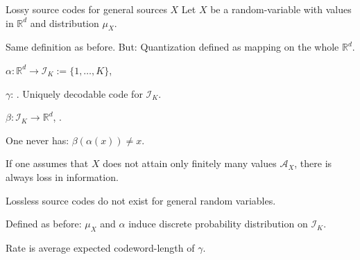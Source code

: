 \begin{frame}{Lossy source codes for general sources $X$} 
Let $X$ be a random-variable with values in $\mathbb{R}^d$ and distribution $\mu_X$. 
\bit
\item Same definition as before. But: Quantization defined as mapping on the whole $\mathbb{R}^d$.
\item $\alpha: \mathbb{R}^d\to \mathcal{I}_K:=\{1,\dots,K\}$, 
\item $\gamma$: . Uniquely decodable code for $\mathcal{I}_K$. 
\item $\beta: \mathcal{I}_K\to\mathbb{R}^d$, . 
\eit

\bit
\item One never has: $\beta(\alpha(x))\neq x$.
\item[\iarrow] If one assumes that $X$ does not attain only finitely many values $\mathcal{A}_X$,  there is always loss in information.
\item Lossless source codes do not exist for general random variables.
\eit
\vspace{-0.2cm}
\bit
\item Defined as before: $\mu_X$ and $\alpha$ induce discrete probability distribution on $\mathcal{I}_K$. 
\item [\iarrow] Rate is average expected codeword-length of $\gamma$. 
\eit


\end{frame}

